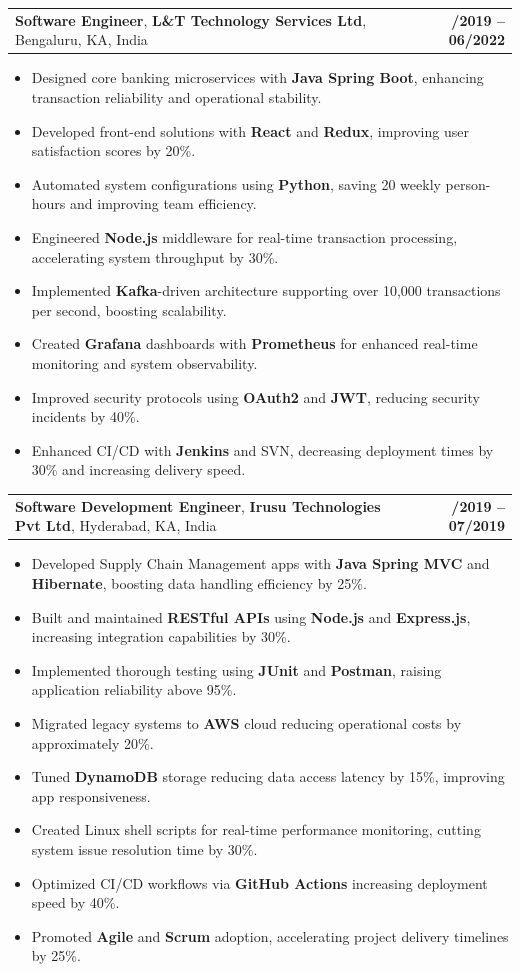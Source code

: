 \documentclass[letterpaper,11pt]{article}
\makeatletter
\newcommand{\resumeItem}[1]{
  \item\footnotesize{
    {#1 \vspace{-2pt}}
  }
}
\newcommand{\resumeSubheading}[4]{
  \vspace{-2pt}\item
    \begin{tabular*}{1.0\textwidth}[t]{l@{\extracolsep{\fill}}r}
      \textbf{\fontsize{10pt}{14pt}\selectfont #3}, \textbf{\fontsize{10pt}{14pt}\selectfont #1}, \fontsize{10pt}{14pt}\selectfont #4 & \textbf{\fontsize{10pt}{14pt}\selectfont #2} \\
    \end{tabular*}\vspace{-7pt}
}
\newcommand{\resumeItemListStart}{\begin{itemize}[leftmargin=*]}
\newcommand{\resumeItemListEnd}{\end{itemize}\vspace{-5pt}}
\makeatother
\begin{document}
    \resumeSubheading
        {L\&T Technology Services Ltd}{08/2019 -- 06/2022}
        {Software Engineer}{Bengaluru, KA, India}
      \resumeItemListStart
        \resumeItem{Designed core banking microservices with \textbf{Java Spring Boot}, enhancing transaction reliability and operational stability.}
        \resumeItem{Developed front-end solutions with \textbf{React} and \textbf{Redux}, improving user satisfaction scores by 20\%.}
        \resumeItem{Automated system configurations using \textbf{Python}, saving 20 weekly person-hours and improving team efficiency.}
        \resumeItem{Engineered \textbf{Node.js} middleware for real-time transaction processing, accelerating system throughput by 30\%.}
        \resumeItem{Implemented \textbf{Kafka}-driven architecture supporting over 10,000 transactions per second, boosting scalability.}
        \resumeItem{Created \textbf{Grafana} dashboards with \textbf{Prometheus} for enhanced real-time monitoring and system observability.}
        \resumeItem{Improved security protocols using \textbf{OAuth2} and \textbf{JWT}, reducing security incidents by 40\%.}
        \resumeItem{Enhanced CI/CD with \textbf{Jenkins} and SVN, decreasing deployment times by 30\% and increasing delivery speed.}
      \resumeItemListEnd

    \resumeSubheading
        {Irusu Technologies Pvt Ltd}{01/2019 -- 07/2019}
        {Software Development Engineer}{Hyderabad, KA, India}
      \resumeItemListStart
        \resumeItem{Developed Supply Chain Management apps with \textbf{Java Spring MVC} and \textbf{Hibernate}, boosting data handling efficiency by 25\%.}
        \resumeItem{Built and maintained \textbf{RESTful APIs} using \textbf{Node.js} and \textbf{Express.js}, increasing integration capabilities by 30\%.}
        \resumeItem{Implemented thorough testing using \textbf{JUnit} and \textbf{Postman}, raising application reliability above 95\%.}
        \resumeItem{Migrated legacy systems to \textbf{AWS} cloud reducing operational costs by approximately 20\%.}
        \resumeItem{Tuned \textbf{DynamoDB} storage reducing data access latency by 15\%, improving app responsiveness.}
        \resumeItem{Created Linux shell scripts for real-time performance monitoring, cutting system issue resolution time by 30\%.}
        \resumeItem{Optimized CI/CD workflows via \textbf{GitHub Actions} increasing deployment speed by 40\%.}
        \resumeItem{Promoted \textbf{Agile} and \textbf{Scrum} adoption, accelerating project delivery timelines by 25\%.}
      \resumeItemListEnd
\end{document}
